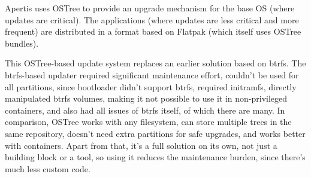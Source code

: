 \documentclass[10pt, a5paper]{article}
\begin{document}
Apertis uses OSTree to provide an upgrade mechanism for the base OS (where updates are critical). The applications (where updates are less critical and more frequent) are distributed in a format based on Flatpak (which itself uses OSTree bundles).

This OSTree-based update system replaces an earlier solution based on btrfs. The btrfs-based updater required significant maintenance effort, couldn’t be used for all partitions, since bootloader didn’t support btrfs, required initramfs, directly manipulated btrfs volumes, making it not possible to use it in non-privileged containers, and also had all issues of btrfs itself, of which there are many. In comparison, OSTree works with any filesystem, can store multiple trees in the same repository, doesn’t need extra partitions for safe upgrades, and works better with containers. Apart from that, it's a full solution on its own, not just a building block or a tool, so using it reduces the maintenance burden, since there’s much less custom code.
\end{document}
